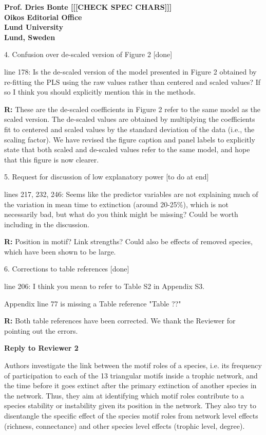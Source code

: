 \documentclass[12pt]{letter}
\begin{document}
\begin{letter}{\bf Prof. Dries Bonte [[[CHECK SPEC CHARS]]]\\
Oikos Editorial Office \\
Lund University \\
Lund, Sweden}
\begin{quotation}
    \end{quotation}

  4. Confusion over de-scaled version of Figure 2 [done]

    line 178: Is the de-scaled version of the model presented in Figure 2 obtained by re-fitting the PLS using the raw values rather than centered and scaled values? If so I think you should explicitly mention this in the methods.   


    \textbf{R:} These are the de-scaled coefficients in Figure 2 refer to the same model as the scaled version. The de-scaled values are obtained by multiplying the coefficients fit to centered and scaled values by the standard deviation of the data (i.e., the scaling factor). We have revised the figure caption and panel labels to explicitly state that both scaled and de-scaled values refer to the same model, and hope that this figure is now clearer.


  5. Request for discussion of low explanatory power [to do at end]

    lines 217, 232, 246: Seems like the predictor variables are not explaining much of the variation in mean time to extinction (around 20-25\%), which is not necessarily bad, but what do you think might be missing? Could be worth including in the discussion.

    \textbf{R:}
    Position in motif? Link strengths? Could also be effects of removed species, which have been shown to be large.


  6. Corrections to table references [done]

    line 206: I think you mean to refer to Table S2 in Appendix S3.

    Appendix line 77 is missing a Table reference "Table ??"

    \textbf{R:} Both table references have been corrected. We thank the Reviewer for pointing out the errors.


\clearpage

\Large{\textbf{Reply to Reviewer 2}}

  Authors investigate the link between the motif roles of a species, i.e. its frequency of participation to each of the 13 triangular motifs inside a trophic network, and the time before it goes extinct after the primary extinction of another species in the network. Thus, they aim at identifying which motif roles contribute to a species stability or instability given its position in the network. They also try to disentangle the specific effect of the species motif roles from network level effects (richness, connectance) and other species level effects (trophic level, degree).


\end{letter}
\end{document}
